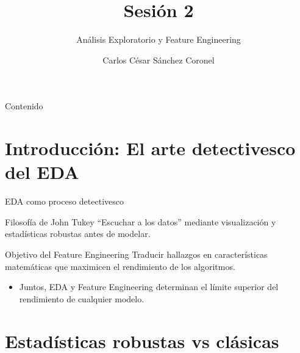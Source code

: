 \documentclass[aspectratio=169, 10pt, xcolor=table]{beamer}
\title[SESIÓN 2]{\textbf{Sesión 2}}
\subtitle{Análisis Exploratorio y Feature Engineering}
\author[Prof. C. Sánchez]{Carlos César Sánchez Coronel}
\institute{\textbf{MACHINE LEARNING}}
\date{}
\begin{document}
\begin{frame}
    \titlepage
\end{frame}

\begin{frame}{Contenido}
    \tableofcontents
\end{frame}

\section{Introducción: El arte detectivesco del EDA}

\begin{frame}{EDA como proceso detectivesco}
    \begin{block}{Filosofía de John Tukey}
        “Escuchar a los datos” mediante visualización y estadísticas robustas antes de modelar.
    \end{block}
    \begin{exampleblock}{Objetivo del Feature Engineering}
        Traducir hallazgos en características matemáticas que maximicen el rendimiento de los algoritmos.
    \end{exampleblock}
    \begin{itemize}
        \item Juntos, EDA y Feature Engineering determinan el límite superior del rendimiento de cualquier modelo.
    \end{itemize}
\end{frame}

\section{Estadísticas robustas vs clásicas}
\end{document}
